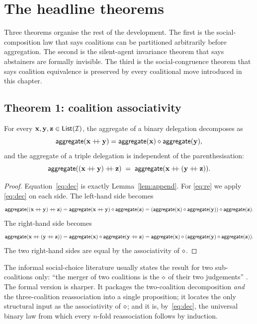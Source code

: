 \section{The headline theorems}
\label{sec:headline}

Three theorems organise the rest of the development. The first is
the social-composition law that says coalitions can be partitioned
arbitrarily before aggregation. The second is the
silent-agent invariance theorem that says abstainers are formally
invisible. The third is the social-congruence theorem that says
coalition equivalence is preserved by every coalitional move
introduced in this chapter.

\subsection*{Theorem 1: coalition associativity}

\begin{theorem}\label{thm:assoc}
For every $\mathbf{x}, \mathbf{y}, \mathbf{z} \in \mathsf{List}(\mathcal{I})$, the aggregate of a
binary delegation decomposes as
\begin{equation}\label{eq:dec}
  \mathsf{aggregate}(\mathbf{x} \mathbin{+\!\!+} \mathbf{y}) = \mathsf{aggregate}(\mathbf{x}) \mathbin{\diamond} \mathsf{aggregate}(\mathbf{y}),
\end{equation}
and the aggregate of a triple delegation is independent of the
parenthesisation:
\begin{equation}\label{eq:re}
  \aggregate((\xs \mathbin{+\!\!+} \ys) \mathbin{+\!\!+} \zs)
  \;=\; \aggregate(\xs \mathbin{+\!\!+} (\ys \mathbin{+\!\!+} \zs)).
\end{equation}
\end{theorem}

\begin{proof}
Equation~\eqref{eq:dec} is exactly Lemma~\ref{lem:append}.
For \eqref{eq:re} we apply \eqref{eq:dec} on each side. The
left-hand side becomes
\[
  \mathsf{aggregate}((\mathbf{x} \mathbin{+\!\!+} \mathbf{y}) \mathbin{+\!\!+} \mathbf{z})
  = \mathsf{aggregate}(\mathbf{x} \mathbin{+\!\!+} \mathbf{y}) \mathbin{\diamond} \mathsf{aggregate}(\mathbf{z})
  = (\mathsf{aggregate}(\mathbf{x}) \mathbin{\diamond} \mathsf{aggregate}(\mathbf{y})) \mathbin{\diamond} \mathsf{aggregate}(\mathbf{z}).
\]
The right-hand side becomes
\[
  \mathsf{aggregate}(\mathbf{x} \mathbin{+\!\!+} (\mathbf{y} \mathbin{+\!\!+} \mathbf{z}))
  = \mathsf{aggregate}(\mathbf{x}) \mathbin{\diamond} \mathsf{aggregate}(\mathbf{y} \mathbin{+\!\!+} \mathbf{z})
  = \mathsf{aggregate}(\mathbf{x}) \mathbin{\diamond} (\mathsf{aggregate}(\mathbf{y}) \mathbin{\diamond} \mathsf{aggregate}(\mathbf{z})).
\]
The two right-hand sides are equal by the associativity of $\mathbin{\diamond}$.
\end{proof}

The informal social-choice literature usually states the result for
two sub-coalitions only: ``the merger of two coalitions is the
$\mathbin{\diamond}$ of their two judgements'' \cite{Arrow1951, Sen1970}. The
formal version is sharper. It packages the two-coalition decomposition
\emph{and} the three-coalition reassociation into a single
proposition; it locates the only structural input as the
associativity of $\mathbin{\diamond}$; and it is, by~\eqref{eq:dec}, the
universal binary law from which every $n$-fold reassociation follows
by induction.

